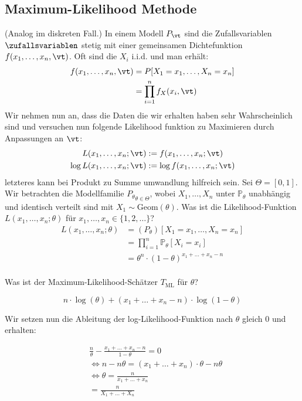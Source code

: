 \subsection*{Maximum-Likelihood Methode}
(Analog im diskreten Fall.) In einem Modell $P_\vt$ sind die Zufallsvariablen
$\zufallsvariablen$ stetig mit einer gemeinsamen Dichtefunktion
$f (x_1, \dots, x_n, \vt)$. Oft sind die $X_i$ i.i.d. und man erhält:
\begin{align*}
  f (x_1, \dots, x_n, \vt) & = P[X_1 = x_1, \dots, X_n = x_n] \\
                           & = \prod_{i = 1}^n f_X (x_i, \vt)
\end{align*}
Wir nehmen nun an, dass die Daten die wir erhalten haben sehr
Wahrscheinlich sind und versuchen nun folgende Likelihood funktion
zu Maximieren durch Anpassungen an $\vt$:
\begin{align*}
  L (x_1, \dots, x_n; \vt)      & := f (x_1, \dots, x_n; \vt)      \\
  \log L (x_1, \dots, x_n; \vt) & := \log f (x_1, \dots, x_n; \vt)
\end{align*}
letzteres kann bei Produkt zu Summe umwandlung hilfreich sein.
\BoxStart{}
Sei $\Theta = [0, 1]$. Wir betrachten die Modellfamilie $ {P_\theta}_{\theta \in \Theta}$, wobei $X_1, \ldots, X_n$ unter $\mathbb{P}_\theta$ unabhängig und identisch verteilt sind mit $X_1 \sim \text{Geom} (\theta)$. Was ist die Likelihood-Funktion $L (x_1, \ldots, x_n; \theta)$ für $x_1, \ldots, x_n \in \{1, 2, \ldots\}$?
\begin{align*}
  L (x_1, \ldots, x_n; \theta) & =  (P_\theta) [X_1 = x_1,\ldots , X_n = x_n]            \\
                               & =\prod_{i = 1}^n \mathbb{P}_\theta[X_i = x_i]           \\
                               & = \theta^n \cdot  (1 - \theta)^{x_1 + \ldots + x_n - n}
\end{align*}
\\
Was ist der Maximum-Likelihood-Schätzer $T_{\text{ML}}$ für $\theta$?

$$n \cdot \log (\theta) +  (x_1 + \ldots + x_n - n) \cdot \log (1 - \theta)$$

Wir setzen nun die Ableitung der log-Likelihood-Funktion nach $\theta$ gleich
$0$ und erhalten:

\begin{align*}
   & \frac{n}{\theta} - \frac{x_1 + \ldots + x_n - n}{1 - \theta} = 0               \\
   & \Longleftrightarrow n - n\theta =  (x_1 + \ldots + x_n) \cdot \theta - n\theta \\
   & \Longleftrightarrow \theta = \frac{n}{x_1 + \ldots + x_n}                      \\
   & = \frac{n}{X_1 + \ldots + X_n}
\end{align*}

